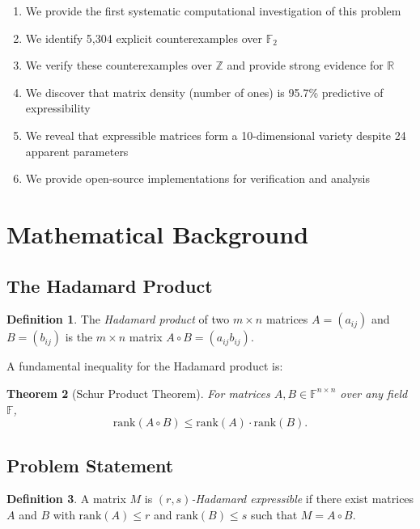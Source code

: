 \documentclass[11pt]{amsart}
\theoremstyle{plain}
\newtheorem{theorem}{Theorem}
\theoremstyle{definition}
\newtheorem{definition}[theorem]{Definition}
\theoremstyle{remark}
\begin{document}
\begin{enumerate}
\item We provide the first systematic computational investigation of this problem
\item We identify 5,304 explicit counterexamples over $\mathbb{F}_2$
\item We verify these counterexamples over $\mathbb{Z}$ and provide strong evidence for $\mathbb{R}$
\item We discover that matrix density (number of ones) is 95.7\% predictive of expressibility
\item We reveal that expressible matrices form a 10-dimensional variety despite 24 apparent parameters
\item We provide open-source implementations for verification and analysis
\end{enumerate}

\section{Mathematical Background}

\subsection{The Hadamard Product}

\begin{definition}
The \emph{Hadamard product} of two $m \times n$ matrices $A = (a_{ij})$ and $B = (b_{ij})$ is the $m \times n$ matrix $A \circ B = (a_{ij}b_{ij})$.
\end{definition}

A fundamental inequality for the Hadamard product is:

\begin{theorem}[Schur Product Theorem]
For matrices $A, B \in \mathbb{F}^{n \times n}$ over any field $\mathbb{F}$,
\[
\mathrm{rank}(A \circ B) \leq \mathrm{rank}(A) \cdot \mathrm{rank}(B).
\]
\end{theorem}

\subsection{Problem Statement}

\begin{definition}
A matrix $M$ is \emph{$(r,s)$-Hadamard expressible} if there exist matrices $A$ and $B$ with $\mathrm{rank}(A) \leq r$ and $\mathrm{rank}(B) \leq s$ such that $M = A \circ B$.
\end{definition}
\end{document}
